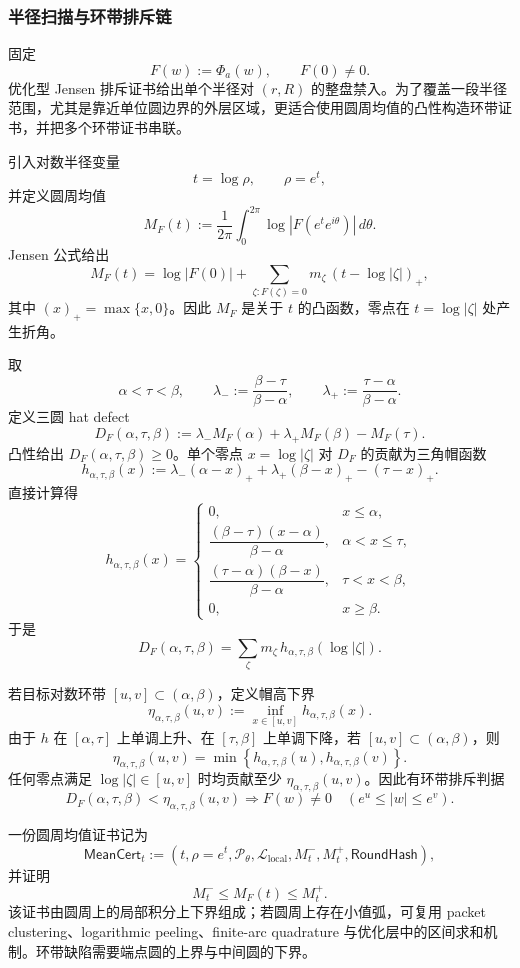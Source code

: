 \subsubsection{半径扫描与环带排斥链}\label{subsubsec:typed-address-biaxial-completion-radial-sweep-annulus-chain}
固定
\[
F(w):=\Phi_a(w),
\qquad
F(0)\ne0.
\]
优化型 Jensen 排斥证书给出单个半径对 \((r,R)\) 的整盘禁入。为了覆盖一段半径范围，尤其是靠近单位圆边界的外层区域，更适合使用圆周均值的凸性构造环带证书，并把多个环带证书串联。

引入对数半径变量
\[
t=\log\rho,
\qquad
\rho=e^t,
\]
并定义圆周均值
\[
M_F(t)
:=
\frac1{2\pi}
\int_0^{2\pi}
\log |F(e^t e^{i\theta})|\,d\theta.
\]
Jensen 公式给出
\[
M_F(t)
=
\log|F(0)|
+
\sum_{\zeta:F(\zeta)=0}
m_\zeta\,(t-\log|\zeta|)_+,
\]
其中 \((x)_+=\max\{x,0\}\)。因此 \(M_F\) 是关于 \(t\) 的凸函数，零点在 \(t=\log|\zeta|\) 处产生折角。

取
\[
\alpha<\tau<\beta,
\qquad
\lambda_-:=\frac{\beta-\tau}{\beta-\alpha},
\qquad
\lambda_+:=\frac{\tau-\alpha}{\beta-\alpha}.
\]
定义三圆 hat defect
\[
D_F(\alpha,\tau,\beta)
:=
\lambda_-M_F(\alpha)
+
\lambda_+M_F(\beta)
-
M_F(\tau).
\]
凸性给出 \(D_F(\alpha,\tau,\beta)\ge0\)。单个零点 \(x=\log|\zeta|\) 对 \(D_F\) 的贡献为三角帽函数
\[
h_{\alpha,\tau,\beta}(x)
:=
\lambda_-(\alpha-x)_+
+
\lambda_+(\beta-x)_+
-
(\tau-x)_+.
\]
直接计算得
\[
h_{\alpha,\tau,\beta}(x)=
\begin{cases}
0,&x\le\alpha,\\[3pt]
\dfrac{(\beta-\tau)(x-\alpha)}{\beta-\alpha},
&\alpha<x\le\tau,\\[9pt]
\dfrac{(\tau-\alpha)(\beta-x)}{\beta-\alpha},
&\tau<x<\beta,\\[9pt]
0,&x\ge\beta.
\end{cases}
\]
于是
\[
D_F(\alpha,\tau,\beta)
=
\sum_{\zeta}
m_\zeta\,
h_{\alpha,\tau,\beta}(\log|\zeta|).
\]

若目标对数环带 \([u,v]\subset(\alpha,\beta)\)，定义帽高下界
\[
\eta_{\alpha,\tau,\beta}(u,v)
:=
\inf_{x\in[u,v]}h_{\alpha,\tau,\beta}(x).
\]
由于 \(h\) 在 \([\alpha,\tau]\) 上单调上升、在 \([\tau,\beta]\) 上单调下降，若 \([u,v]\subset(\alpha,\beta)\)，则
\[
\eta_{\alpha,\tau,\beta}(u,v)
=
\min\left\{
h_{\alpha,\tau,\beta}(u),
h_{\alpha,\tau,\beta}(v)
\right\}.
\]
任何零点满足 \(\log|\zeta|\in[u,v]\) 时均贡献至少 \(\eta_{\alpha,\tau,\beta}(u,v)\)。因此有环带排斥判据
\[
D_F(\alpha,\tau,\beta)
<
\eta_{\alpha,\tau,\beta}(u,v)
\Longrightarrow
F(w)\ne0
\quad(e^u\le |w|\le e^v).
\]

\begin{definition}[圆周均值证书]\label{def:typed-address-biaxial-completion-circle-mean-certificate}
一份圆周均值证书记为
\[
\mathsf{MeanCert}_t
:=
\left(
t,\rho=e^t,
\mathcal P_\theta,
\mathcal L_{\mathrm{local}},
M_t^-,M_t^+,
\mathsf{RoundHash}
\right),
\]
并证明
\[
M_t^-\le M_F(t)\le M_t^+.
\]
该证书由圆周上的局部积分上下界组成；若圆周上存在小值弧，可复用 packet clustering、logarithmic peeling、finite-arc quadrature 与优化层中的区间求和机制。环带缺陷需要端点圆的上界与中间圆的下界。
\end{definition}

